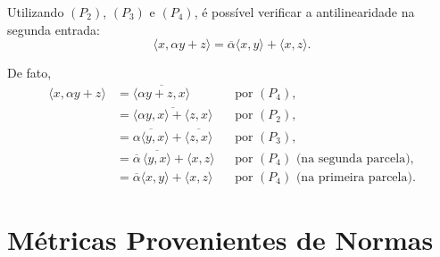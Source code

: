 Utilizando $(P_2)$, $(P_3)$ e $(P_4)$, é possível verificar a antilinearidade na segunda entrada:
$$\langle x,\alpha y+z\rangle = \overline{\alpha}\langle x,y\rangle+\langle x,z\rangle\text{.}$$

De fato,
\begin{align*}
	\langle x,\alpha y+z\rangle & = \overline{\langle \alpha y+z,x\rangle}                            &  & \text{por $(P_4)$,}                  \\
	                            & = \overline{\langle \alpha y,x\rangle+\langle z,x\rangle}            &  & \text{por $(P_2)$,}                  \\
	                            & = \overline{\alpha\langle y,x\rangle}+\overline{\langle z,x\rangle}  &  & \text{por $(P_3)$,}                  \\
	                            & = \overline{\alpha}\,\overline{\langle y,x\rangle}+\langle x,z\rangle &  & \text{por $(P_4)$ (na segunda parcela),} \\
	                            & = \overline{\alpha}\langle x,y\rangle+\langle x,z\rangle             &  & \text{por $(P_4)$ (na primeira parcela).}
\end{align*}



\section{Métricas Provenientes de Normas}

